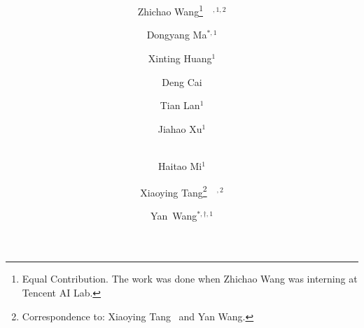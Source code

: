 \title{ \\ }


\renewcommand\Authfont{\bfseries}

\author[ ]{Zhichao Wang\thanks{Equal Contribution. The work was done when Zhichao Wang was interning at Tencent AI Lab.}~~$^{,1,2}$}
\author[ ]{Dongyang Ma$^{*, 1}$}
\author[ ]{Xinting Huang$^{1}$}
\author[ ]{Deng Cai}
\author[ ]{Tian Lan$^{1}$}
\author[ ]{Jiahao Xu$^{1}$}
\author[ ]{\\Haitao Mi$^{1}$}
\author[ ]{Xiaoying Tang\thanks{Correspondence to: Xiaoying Tang  ~and Yan Wang.}~~$^{,2}$}
\author[ ]{\mbox{Yan Wang}$^{*, \dag,1}$}




